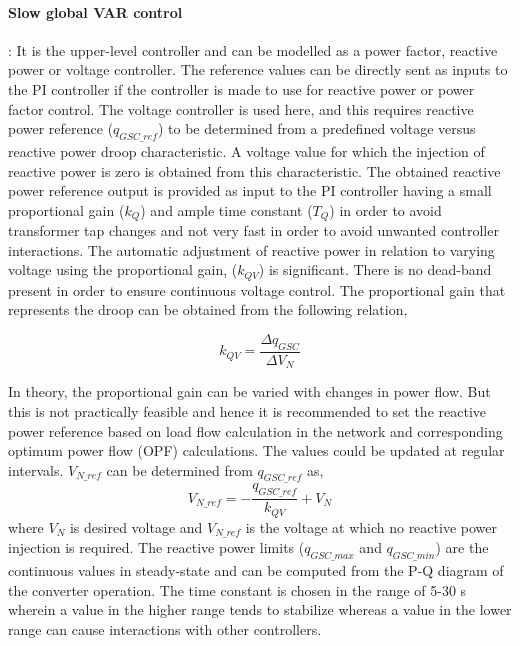 \paragraph{Slow global VAR control}:
It is the upper-level controller and can be modelled as a power factor, reactive power or voltage controller. The reference values can be directly sent as inputs to the \gls{PI} controller if the controller is made to use for reactive power or power factor control. The voltage controller is used here, and this requires reactive power reference ($q_{GSC\_ref}$) to be determined from a predefined voltage versus reactive power droop characteristic. A voltage value for which the injection of reactive power is zero is obtained from this characteristic. The obtained reactive power reference output is provided as input to the \gls{PI} controller having a small proportional gain ($k_Q$) and ample time constant ($T_Q$) in order to avoid transformer tap changes and not very fast in order to avoid unwanted controller interactions. The automatic adjustment of reactive power in relation to varying voltage using the proportional gain, ($k_{QV}$) is significant. There is no dead-band present in order to ensure continuous voltage control. The  proportional gain that represents the droop can be obtained from the following relation,

\begin{equation}
    k_{QV} = \frac{\Delta q_{GSC}}{\Delta V_N}
\end{equation}

In theory, the proportional gain can be varied with changes in power flow. But this is not practically feasible and hence it is recommended to set the reactive power reference based on load flow calculation in the network and corresponding optimum power flow (OPF) calculations. The values could be updated at regular intervals. $V_{N\_{ref}}$ can be determined from $q_{GSC\_ref}$ as,
\begin{equation}
    V_{N\_{ref}} = -\frac{q_{GSC\_ref}}{k_{QV}} + V_N
\end{equation}
where $V_N$ is desired voltage and $V_{N\_{ref}}$ is the voltage at which no reactive power injection is required.
The reactive power limits ($q_{GSC\_max}$ and $q_{GSC\_min}$) are the continuous values in steady-state and can be computed from the P-Q diagram of the converter operation. The time constant is chosen in the range of 5-30 s wherein a value in the higher range tends to stabilize whereas a value in the lower range can cause interactions with other controllers.

